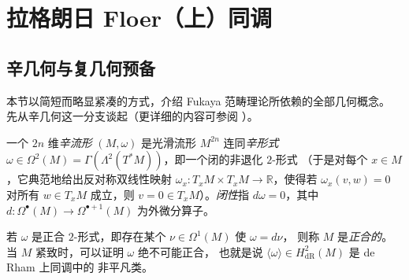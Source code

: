 \section{拉格朗日 Floer（上）同调}\label{ch:05}

\setcounter{equation}{53}


\subsection{辛几何与复几何预备}\label{sec:5.1}

本节以简短而略显紧凑的方式，介绍 Fukaya 范畴理论所依赖的全部几何概念。
先从辛几何这一分支谈起（更详细的内容可参阅 \cite{Sil12}）。

\begin{Def}\label{def:5.1}
一个 $2n$ 维\emph{辛流形} $(M,\omega)$ 是光滑流形 $M^{2n}$ 连同\emph{辛形式}
$\omega\in\Omega^2(M)=\Gamma(\Lambda^2(T^*M))$，即一个闭的非退化 $2$-形式
（于是对每个 $x\in M$，它典范地给出反对称双线性映射
$\omega_x:T_xM\times T_xM\to\mathbb R$，使得若 $\omega_x(v,w)=0$ 对所有
$w\in T_xM$ 成立，则 $v=0\in T_xM$）。\emph{闭性}指 $d\omega=0$，其中
$d:\Omega^\bullet(M)\to\Omega^{\bullet+1}(M)$ 为外微分算子。

若 $\omega$ 是正合 $2$-形式，即存在某个 $\nu\in\Omega^1(M)$ 使 $\omega=d\nu$，
则称 $M$ 是\emph{正合的}。当 $M$ 紧致时，可以证明 $\omega$ 绝不可能正合，
也就是说 $\langle\omega\rangle\in H^2_{\mathrm{dR}}(M)$ 是 de Rham 上同调中的
非平凡类。
\end{Def}


